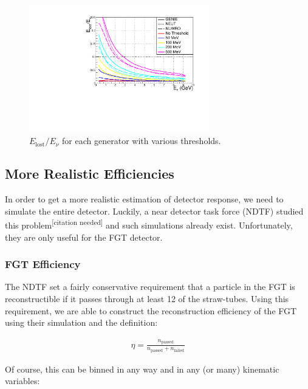 \documentclass{article}
\begin{document}
\begin{figure}[!h]
  \begin{center}
    \includegraphics[width=0.7\textwidth]{plots.old/fig14.pdf}
    \caption{$E_{\mathrm{lost}}/E_\nu$ for each generator with various thresholds.}
  \end{center}
\end{figure}

\subsection{More Realistic Efficiencies}

In order to get a more realistic estimation of detector response, we need to simulate the entire detector.  Luckily, a near detector task force (NDTF) studied this problem\textsuperscript{[citation needed]} and such simulations already exist.  Unfortunately, they are only useful for the FGT detector.


\subsubsection{FGT Efficiency}

The NDTF set a fairly conservative requirement that a particle in the FGT is reconstructible if it passes through at least 12 of the straw-tubes.  Using this requirement, we are able to construct the reconstruction efficiency of the FGT using their simulation and the definition:

\begin{align}
  \eta = \frac{n_{\mathrm{passed}}}{n_{\mathrm{passed}} + n_{\mathrm{failed}}}
\end{align}

Of course, this can be binned in any way and in any (or many) kinematic variables:
\end{document}
